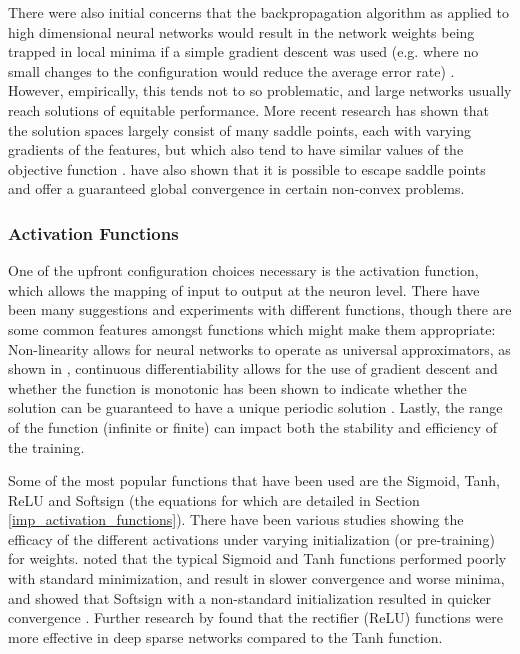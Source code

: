 \documentclass[a4paper,11pt,oneside]{article}
\theoremstyle{plain}
\theoremstyle{definition}
\begin{document}
	There were also initial concerns that the backpropagation algorithm as applied to high dimensional neural networks would result 
	in the network weights being trapped in local minima if a simple gradient descent was used (e.g. where no small 
	changes to the configuration would reduce the average error rate) \citep{LeCun4}. 
	However, empirically, this tends not to so problematic, and large networks usually reach solutions of equitable 
	performance. More recent research has shown that the solution spaces largely consist of many saddle points, each 
	with varying gradients of the features, but which also tend to have similar values of the objective function \citep{Dauphin}. 
	\citet{Ge} have also shown that it is possible to escape saddle points and offer a guaranteed global convergence 
	in certain non-convex problems.
	\hfill \break 
	
	\subsubsection{Activation Functions}\label{lr_activationfunctions}
	
	One of the upfront configuration choices necessary is the activation function, which allows the mapping of input 
	to output at the neuron level. There have been many suggestions and experiments with different functions, though 
	there are some common features amongst functions which might make them appropriate: Non-linearity allows for 
	neural networks to operate as universal approximators, as shown in \citep{Hornik}, continuous differentiability allows for the 
	use of gradient descent and whether the function is monotonic has been shown to indicate whether the solution 
	can be guaranteed to have a unique periodic solution \citep{Wu}. Lastly, the range of the function (infinite or finite) can impact both the 
	stability and efficiency of the training.
	\hfill \break 
	
	Some of the most popular functions that have been used are the Sigmoid, Tanh, ReLU and Softsign (the equations for which are detailed in Section \ref{imp_activation_functions}). There have 
	been various studies showing the efficacy of the different activations under varying initialization (or pre-training) 
	for weights. \citet{Glorot} noted that the typical Sigmoid and Tanh functions performed poorly with standard 
	minimization, and result in slower convergence and worse minima, and showed that Softsign with a non-standard 
	initialization resulted in quicker convergence . Further research by \citet{Glorot2} found that the 
	rectifier (ReLU) functions were more effective in deep sparse networks compared to the Tanh function.
	
\end{document}

